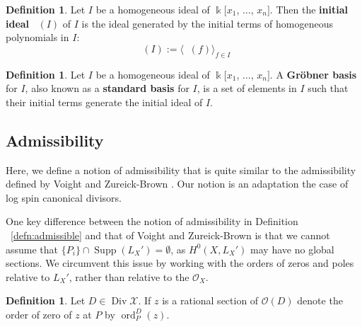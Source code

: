 \documentclass{amsart}
\theoremstyle{plain}
\theoremstyle{definition}
\newtheorem{defn}[thm]{Definition}
\theoremstyle{remark}
\numberwithin{equation}{section}
\newcommand\ssec{\subsection}
\newcommand\Bk{{\Bbbk}}
\newcommand\sco{{\mathscr O}}
\DeclareMathOperator{\ord}{ord}
\DeclareMathOperator\di{Div}
\newcommand\sx{\mathscr X}
\newcommand{\halfcan}{L}
\DeclareMathOperator{\Supp}{Supp}
\DeclareMathOperator{\initial}{in_\prec}
\begin{document}
\begin{defn}
\label{defn:initial-ideal}
Let $I$ be a homogeneous ideal of $\Bk[x_{1}$, $\ldots$,
$x_{n}]$. Then the {\bf initial ideal} $\initial(I)$ of $I$ is
the ideal generated by the initial terms of homogeneous polynomials
in $I$:
\[
	\initial(I) := \langle \initial(f) \rangle_{f \in I}
\]
\end{defn}

\begin{defn}
\label{defn:grobner-basis}
Let $I$ be a homogeneous ideal of $\Bk[x_{1}$, $\ldots$,
$x_{n}]$. A \textbf{Gr\"obner basis} for $I$, also known as a
\textbf{standard basis} for $I$, is a set of elements in $I$
such that their initial terms generate the initial
ideal of $I$.
\end{defn}

\ssec{Admissibility}
Here, we define a notion of admissibility that is quite similar to the admissibility defined by Voight and Zureick-Brown \cite[Definition 8.5.1]{vzb:stacky}. Our notion is an adaptation the case of log spin canonical divisors.

One key difference between the notion of admissibility in Definition ~\ref{defn:admissible} and that of Voight and Zureick-Brown \cite[Definition 8.5.1]{vzb:stacky} is that
we cannot assume that $\{P_i\} \cap \Supp(L_X') = \emptyset$, as $H^0(X, \halfcan_X')$ may have no global sections. We circumvent this issue by working with the orders of zeros and poles relative to $\halfcan_X'$, rather than relative to the $\sco_X$.

\begin{defn}
\label{def:order-sup}
Let $D \in \di \sx.$ If $z$ is a rational section of $\sco(D)$ denote the order of
zero of $z$ at $P$ by $\ord_P^D(z)$.
\end{defn}
\end{document}
